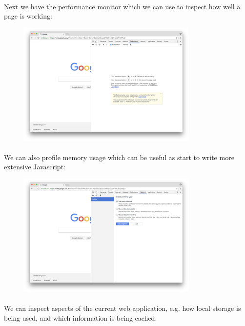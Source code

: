 \paragraph{} Next we have the performance monitor which we can use to inspect how well a page is working:

\begin{figure}[H]
\centering
\includegraphics[width=0.8\textwidth]{figures/devtools-performance.png}
\label{fig:devtools-performance}
\end{figure}

\paragraph{} We can also profile memory usage which can be useful as start to write more extensive Javascript:

\begin{figure}[H]
\centering
\includegraphics[width=0.8\textwidth]{figures/devtools-memory.png}
\label{fig:devtools-memory}
\end{figure}


\paragraph{} We can inspect aspects of the current web application, e.g. how local storage is being used, and which information is being cached:


